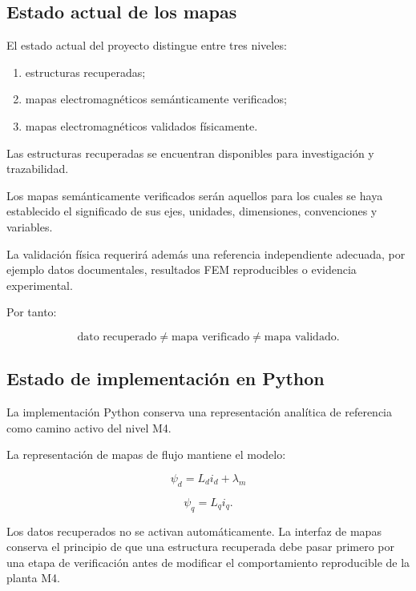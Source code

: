 \subsection{Estado actual de los mapas}

El estado actual del proyecto distingue entre tres niveles:

\begin{enumerate}
\item estructuras recuperadas;
\item mapas electromagnéticos semánticamente verificados;
\item mapas electromagnéticos validados físicamente.
\end{enumerate}

Las estructuras recuperadas se encuentran disponibles para investigación y trazabilidad.

Los mapas semánticamente verificados serán aquellos para los cuales se haya establecido el significado de sus ejes, unidades, dimensiones, convenciones y variables.

La validación física requerirá además una referencia independiente adecuada, por ejemplo datos documentales, resultados FEM reproducibles o evidencia experimental.

Por tanto:

\begin{equation}
\text{dato recuperado}
\neq
\text{mapa verificado}
\neq
\text{mapa validado}.
\end{equation}

\subsection{Estado de implementación en Python}

La implementación Python conserva una representación analítica de referencia como camino activo del nivel M4.

La representación de mapas de flujo mantiene el modelo:

\begin{equation}
\psi_d=L_di_d+\lambda_m
\end{equation}

\begin{equation}
\psi_q=L_qi_q.
\end{equation}

Los datos recuperados no se activan automáticamente. La interfaz de mapas conserva el principio de que una estructura recuperada debe pasar primero por una etapa de verificación antes de modificar el comportamiento reproducible de la planta M4.

